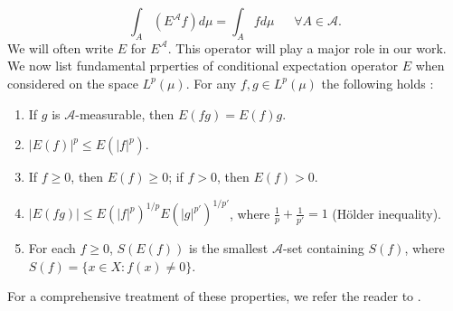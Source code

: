 \documentclass{amsart}
\theoremstyle{definition}\newtheorem{defn}[thm]{Definition}
\theoremstyle{remark}
\numberwithin{equation}{section}
\newcommand{\A}{\mathcal{A}}
\begin{document}
$$\int_{A}(E^{\mathcal{A}}f)d\mu=\int_{A}fd\mu \ \ \ \ \ \ \ \forall A\in \mathcal{A}.$$
We will often write $E$ for $E^{\mathcal{A}}$. This operator will play a major role in our
work. 
We now list fundamental prperties of conditional expectation operator $E$ when considered on the space $L^p(\mu)$. For any $f, g \in L^p(\mu)$ the following holds :
\begin{enumerate}
	\item If $g$ is $\A$-measurable, then $E(fg) = E(f)g$.
	\item $|E(f)|^p \leq E(|f|^p)$.
	\item If $f \geq 0$, then $E(f) \geq 0$; if $f > 0$, then $E(f) > 0$.
	\item $|E(fg)| \leq E(|f|^p)^{1/p} E(|g|^{p'})^{1/p'}$, where $\frac{1}{p} + \frac{1}{p'} = 1$ (Hölder inequality).
	\item For each $f\geq 0$, $S(E(f))$ is the smallest $\mathcal{A}$-set containing $S(f)$, where $S(f)=\{x\in X: f(x)\neq 0\}$.
\end{enumerate}
For a comprehensive treatment of these properties, we refer the reader to \cite{Rao1993}.


%
%
%
%
%
\end{document}
